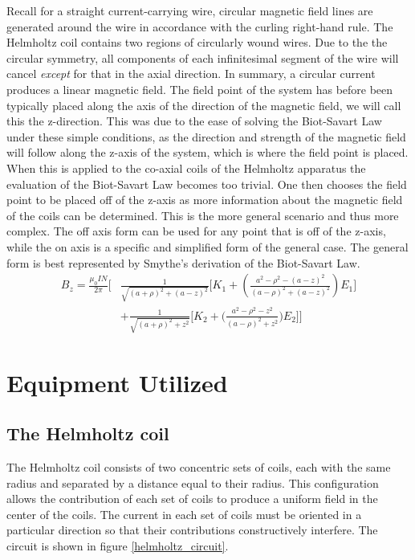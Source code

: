 \documentclass[a4paper]{article}
\begin{document}
Recall for a straight current-carrying wire, circular magnetic field lines are generated around the wire in accordance with the curling right-hand rule. The Helmholtz coil contains two regions of circularly wound wires. Due to the the circular symmetry, all components of each infinitesimal segment of the wire will cancel \textit{except} for that in the axial direction. In summary, a circular current produces a linear magnetic field.
The field point of the system has before been typically placed along the axis of the direction of the magnetic field, we will call this the z-direction. This was due to the ease of solving the Biot-Savart Law under these simple conditions, as the direction and strength of the magnetic field will follow along the z-axis of the system, which is where the field point is placed. When this is applied to the co-axial coils of the Helmholtz apparatus the evaluation of the Biot-Savart Law becomes too trivial. One then chooses the field point to be placed off of the z-axis as more information about the magnetic field of the coils can be determined. This is the more general scenario and thus more complex. The off axis form can be used for any point that is off of the z-axis, while the on axis is a specific and simplified form of the general case. The general form is best represented by Smythe's derivation of the Biot-Savart Law. 
\begin{align*} 
B_z = \frac{\mu_0IN}{2\pi}
\Big[&
    \frac{1}{\sqrt{(a+\rho)^2 + (a-z)^2}}
    \big[
        K_1 + \left(\frac{a^2 -\rho^2 - (a - z)^2}{(a-\rho)^2 + (a - z)^2} \right) E_1 
    \big]\\
    & + \frac{1}{\sqrt{(a + \rho)^2 + z^2}}
    \big[
        K_2 + \big(\frac{a^2 - \rho^2 - z^2}{(a - \rho)^2 + z^2}\big) E_2 
    \big] 
\Big]
\end{align*}
\section{Equipment Utilized}

\subsection{The Helmholtz coil}
The Helmholtz coil consists of two concentric sets of coils, each with the same radius and separated by a distance equal to their radius. This configuration allows the contribution of each set of coils to produce a uniform field in the center of the coils. The current in each set of coils must be oriented in a particular direction so that their contributions constructively interfere. The circuit is shown in figure \ref{helmholtz_circuit}. 
\end{document}
